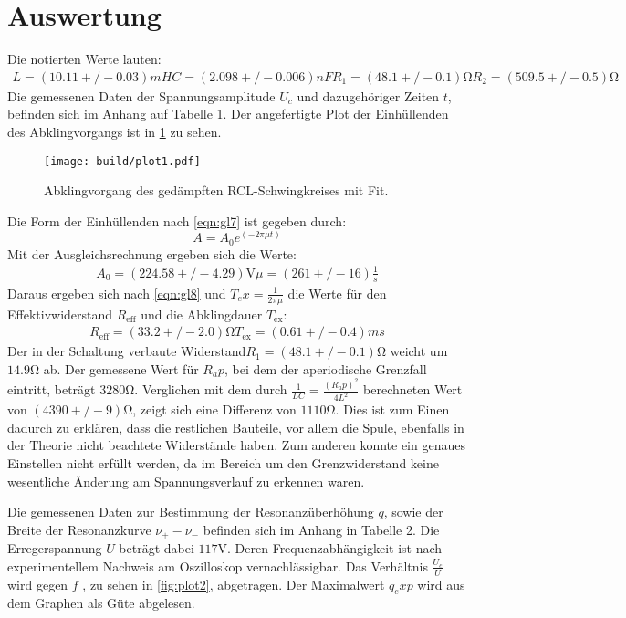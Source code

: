 \section{Auswertung}
\label{sec:Auswertung}
Die notierten Werte lauten:
\begin{align}
L = (10.11 +/- 0.03) mH
C = (2.098 +/- 0.006) nF
R_1 = (48.1 +/- 0.1) \si{\ohm}
R_2 = (509.5 +/- 0.5) \si{\ohm}
\end{align}
Die gemessenen Daten der Spannungsamplitude $U_c$ und dazugehöriger Zeiten $t$,
befinden sich im Anhang auf Tabelle 1.
Der angefertigte Plot der Einhüllenden des Abklingvorgangs ist in \ref{fig:plot1} zu sehen.
\begin{figure}
  \centering
  \texttt{[image: build/plot1.pdf]}
  \caption{Abklingvorgang des gedämpften RCL-Schwingkreises mit Fit.}
  \label{fig:plot1}
\end{figure}

Die Form der Einhüllenden nach \eqref{eqn:gl7} ist gegeben durch:
\begin{equation}
  A = A_0 e^(-2 \pi \mu t)
\end{equation}
Mit der Ausgleichsrechnung ergeben sich die Werte:
\begin{align}
  A_0 = (224.58 +/- 4.29) \si{\volt}
  \mu = (261 +/- 16) \frac{1}{s}
\end{align}
Daraus ergeben sich nach \eqref{eqn:gl8} und $T_ex = \frac{1}{2 \pi \mu}$ die Werte für den Effektivwiderstand $R_{\text{eff}}$ und die Abklingdauer $T_{\text{ex}}$:
\begin{align}
  R_{\text{eff}} = (33.2 +/- 2.0) \si{\ohm}
  T_{\text{ex}} = (0.61 +/- 0.4) ms
\end{align}
Der in der Schaltung verbaute Widerstand$R_1 = (48.1 +/- 0.1) \si{\ohm}$ weicht um $14.9 \si{\ohm}$ ab.
Der gemessene Wert für $R_ap$, bei dem der aperiodische Grenzfall eintritt, beträgt $3280 \si{\ohm}$.
Verglichen mit dem durch $\frac{1}{LC} = \frac{(R_ap)^2}{4L^2}$ berechneten Wert von $(4390 +/- 9) \si{\ohm}$, zeigt sich eine Differenz von $1110 \si{\ohm}$.
Dies ist zum Einen dadurch zu erklären, dass die restlichen Bauteile, vor allem die Spule, ebenfalls in der Theorie nicht beachtete Widerstände haben.
Zum anderen konnte ein genaues Einstellen nicht erfüllt werden, da im Bereich um den Grenzwiderstand keine wesentliche Änderung am Spannungsverlauf zu erkennen waren.

Die gemessenen Daten zur Bestimmung der Resonanzüberhöhung $q$, sowie der Breite der Resonanzkurve $\nu_+ - \nu_-$ befinden sich im Anhang in Tabelle 2.
Die Erregerspannung $U$ beträgt dabei $117 \si{\volt}$.
Deren Frequenzabhängigkeit ist nach experimentellem Nachweis am Oszilloskop vernachlässigbar.
Das Verhältnis $\frac{U_c}{U}$ wird gegen $f$ , zu sehen in \ref{fig:plot2}, abgetragen.
Der Maximalwert $q_exp$ wird aus dem Graphen als Güte abgelesen.

